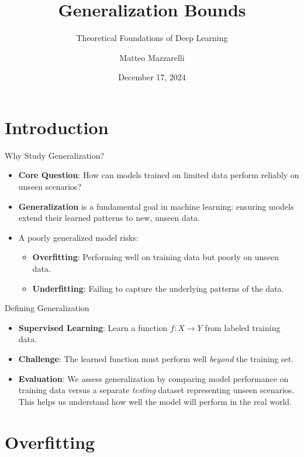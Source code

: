 \documentclass[
  ignorenonframetext,
]{beamer}
\title{Generalization Bounds}
\subtitle{Theoretical Foundations of Deep Learning}
\author{Matteo Mazzarelli}
\date{December 17, 2024}
\providecommand{\tightlist}{%
  \setlength{\itemsep}{0pt}\setlength{\parskip}{0pt}}\usepackage{longtable,booktabs,array}
\begin{document}
\frame{\titlepage}


\section{Introduction}\label{introduction}

\begin{frame}{Why Study Generalization?}
\label{why-study-generalization}
\begin{itemize}
\tightlist
\item
  \textbf{Core Question}: How can models trained on limited data perform
  reliably on unseen scenarios?
\item
  \textbf{Generalization} is a fundamental goal in machine learning:
  ensuring models extend their learned patterns to new, unseen data.
\item
  A poorly generalized model risks:

  \begin{itemize}
  \tightlist
  \item
    \textbf{Overfitting}: Performing well on training data but poorly on
    unseen data.
  \item
    \textbf{Underfitting}: Failing to capture the underlying patterns of
    the data.
  \end{itemize}
\end{itemize}
\end{frame}

\begin{frame}{Defining Generalization}
\label{defining-generalization}
\begin{itemize}
\tightlist
\item
  \textbf{Supervised Learning}: Learn a function \(f\!\!: X \to Y\) from
  labeled training data.
\item
  \textbf{Challenge}: The learned function must perform well
  \emph{beyond} the training set.
\item
  \textbf{Evaluation}: We assess generalization by comparing model
  performance on training data versus a separate \emph{testing} dataset
  representing unseen scenarios. This helps us understand how well the
  model will perform in the real world.
\end{itemize}
\end{frame}

\section{Overfitting}\label{overfitting}
\end{document}
